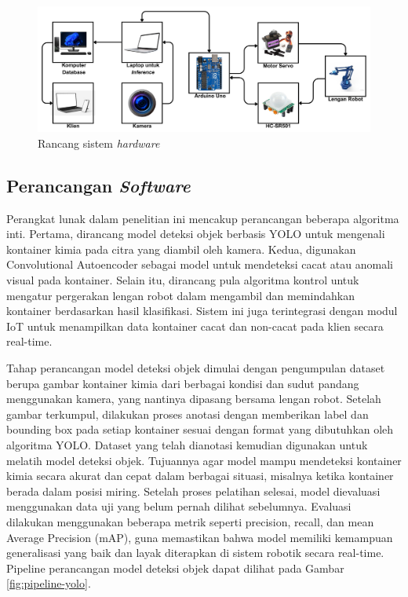 \begin{figure}[H]
  \centering
  \includegraphics[width=\textwidth]{gambar/rancang.png}
  \caption{Rancang sistem \textit{hardware}}
  \label{fig:hardware}
\end{figure}
\vspace{-1em}

\vspace{1em}

\subsection{Perancangan \textit{Software}}
Perangkat lunak dalam penelitian ini mencakup perancangan beberapa
algoritma inti. Pertama, dirancang model deteksi objek berbasis YOLO
untuk mengenali kontainer kimia pada citra yang diambil oleh kamera.
Kedua, digunakan Convolutional Autoencoder sebagai model untuk
mendeteksi cacat atau anomali visual pada kontainer. Selain itu,
dirancang pula algoritma kontrol untuk mengatur pergerakan lengan
robot dalam mengambil dan memindahkan kontainer berdasarkan hasil
klasifikasi. Sistem ini juga terintegrasi dengan modul IoT untuk
menampilkan data kontainer cacat dan non-cacat pada klien secara real-time. \par

Tahap perancangan model deteksi objek dimulai dengan pengumpulan
dataset berupa gambar kontainer kimia dari berbagai kondisi dan sudut
pandang menggunakan kamera, yang nantinya dipasang bersama lengan
robot. Setelah gambar terkumpul, dilakukan proses anotasi dengan
memberikan label dan bounding box pada setiap kontainer sesuai dengan
format yang dibutuhkan oleh algoritma YOLO. Dataset yang telah
dianotasi kemudian digunakan untuk melatih model deteksi objek.
Tujuannya agar model mampu mendeteksi kontainer kimia secara akurat
dan cepat dalam berbagai situasi, misalnya ketika kontainer berada
dalam posisi miring. Setelah proses pelatihan selesai, model
dievaluasi menggunakan data uji yang belum pernah dilihat sebelumnya.
Evaluasi dilakukan menggunakan beberapa metrik seperti precision,
recall, dan mean Average Precision (mAP), guna memastikan bahwa model
memiliki kemampuan generalisasi yang baik dan layak diterapkan di
sistem robotik secara real-time. Pipeline perancangan model deteksi
objek dapat dilihat pada Gambar \ref{fig:pipeline-yolo}.

